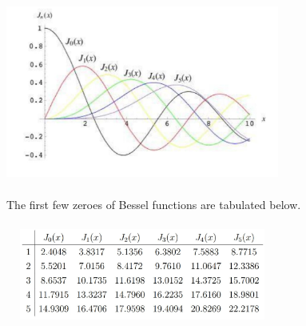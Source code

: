 \documentclass[fleqn]{article}
\begin{document}
\begin{enumerate}
    \includegraphics[height=6cm, width=9cm]{bessel.JPG}

      \textcolor{hwColor}{
        The first few zeroes of Bessel functions are tabulated below. \\ \\
        \includegraphics[height=3cm, width=9cm]{table1.JPG}
      }

  \end{enumerate}
\end{document}
